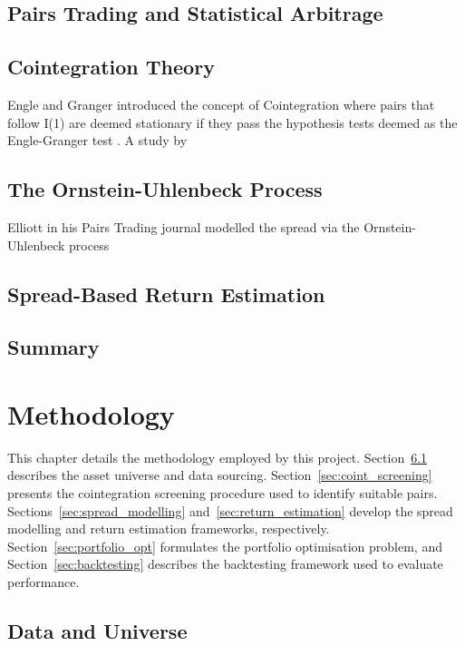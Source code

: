 \documentclass[a4paper]{report}
\begin{document}
\section{Pairs Trading and Statistical Arbitrage}



\section{Cointegration Theory}

Engle and Granger introduced the concept of Cointegration where pairs that follow I(1) are deemed stationary if they pass the hypothesis tests deemed as the Engle-Granger test \cite{englegranger1987}. A study by 

\section{The Ornstein-Uhlenbeck Process}

Elliott in his Pairs Trading journal modelled the spread via the Ornstein-Uhlenbeck process \cite{elliott2005}

\section{Spread-Based Return Estimation}

\section{Summary}

\chapter{Methodology}
\label{chap:methodology}

This chapter details the methodology employed by this project. Section~\ref{sec:data_universe} describes the asset universe and data sourcing. Section~\ref{sec:coint_screening} presents the cointegration screening procedure used to identify suitable pairs. Sections~\ref{sec:spread_modelling} and~\ref{sec:return_estimation} develop the spread modelling and return estimation frameworks, respectively. Section~\ref{sec:portfolio_opt} formulates the portfolio optimisation problem, and Section~\ref{sec:backtesting} describes the backtesting framework used to evaluate performance.

\section{Data and Universe}
\label{sec:data_universe}
\end{document}
